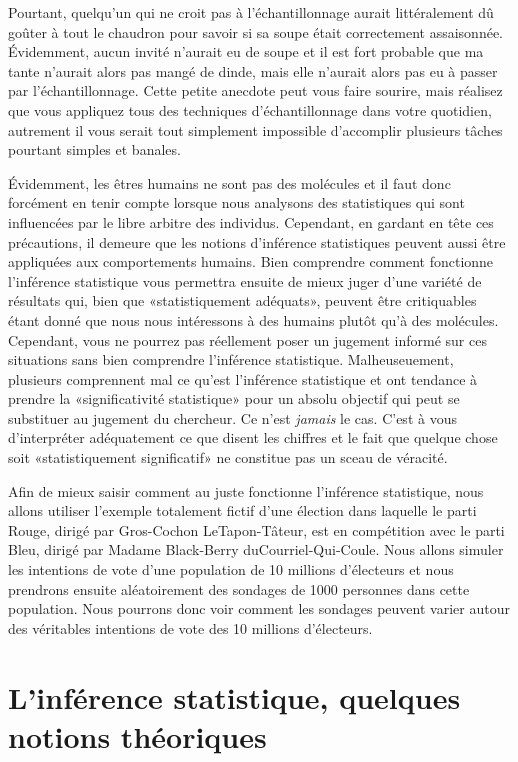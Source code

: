 \documentclass[
]{book}
\begin{document}
Pourtant, quelqu'un qui ne croit pas à l'échantillonnage aurait littéralement dû goûter à tout le chaudron pour savoir si sa soupe était correctement assaisonnée. Évidemment, aucun invité n'aurait eu de soupe et il est fort probable que ma tante n'aurait alors pas mangé de dinde, mais elle n'aurait alors pas eu à passer par l'échantillonnage. Cette petite anecdote peut vous faire sourire, mais réalisez que vous appliquez tous des techniques d'échantillonnage dans votre quotidien, autrement il vous serait tout simplement impossible d'accomplir plusieurs tâches pourtant simples et banales.

Évidemment, les êtres humains ne sont pas des molécules et il faut donc forcément en tenir compte lorsque nous analysons des statistiques qui sont influencées par le libre arbitre des individus. Cependant, en gardant en tête ces précautions, il demeure que les notions d'inférence statistiques peuvent aussi être appliquées aux comportements humains. Bien comprendre comment fonctionne l'inférence statistique vous permettra ensuite de mieux juger d'une variété de résultats qui, bien que «statistiquement adéquats», peuvent être critiquables étant donné que nous nous intéressons à des humains plutôt qu'à des molécules. Cependant, vous ne pourrez pas réellement poser un jugement informé sur ces situations sans bien comprendre l'inférence statistique. Malheuseuement, plusieurs comprennent mal ce qu'est l'inférence statistique et ont tendance à prendre la «significativité statistique» pour un absolu objectif qui peut se substituer au jugement du chercheur. Ce n'est \emph{jamais} le cas. C'est à vous d'interpréter adéquatement ce que disent les chiffres et le fait que quelque chose soit «statistiquement significatif» ne constitue pas un sceau de véracité.

Afin de mieux saisir comment au juste fonctionne l'inférence statistique, nous allons utiliser l'exemple totalement fictif d'une élection dans laquelle le parti Rouge, dirigé par Gros-Cochon LeTapon-Tâteur, est en compétition avec le parti Bleu, dirigé par Madame Black-Berry duCourriel-Qui-Coule. Nous allons simuler les intentions de vote d'une population de 10 millions d'électeurs et nous prendrons ensuite aléatoirement des sondages de 1000 personnes dans cette population. Nous pourrons donc voir comment les sondages peuvent varier autour des véritables intentions de vote des 10 millions d'électeurs.

\hypertarget{linfuxe9rence-statistique-quelques-notions-thuxe9oriques}{%
\section{L'inférence statistique, quelques notions théoriques}\label{linfuxe9rence-statistique-quelques-notions-thuxe9oriques}}
\end{document}
